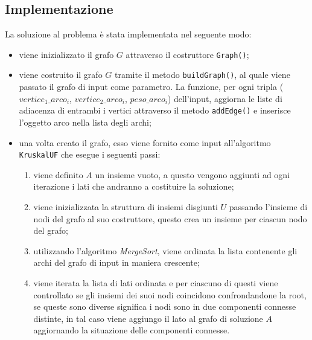 	\subsection{Implementazione}
		La soluzione al problema è stata implementata nel seguente modo:
		\begin{itemize}
			\item viene inizializzato il grafo $G$ attraverso il costruttore \texttt{Graph()};
			\item viene costruito il grafo $G$ tramite il metodo \texttt{buildGraph()}, al quale viene passato il grafo di input come parametro.
			La funzione, per ogni tripla ($vertice_1\_arco_i$, $vertice_2\_arco_i$, $peso\_arco_i$) dell'input, aggiorna le liste di adiacenza di entrambi i vertici attraverso il metodo \texttt{addEdge()} e inserisce l'oggetto arco nella lista degli archi; 
			\item una volta creato il grafo, esso viene fornito come input all'algoritmo \texttt{KruskalUF} che esegue i seguenti passi:
			\begin{enumerate}  				
				\item viene definito $A$ un insieme vuoto, a questo vengono aggiunti ad ogni iterazione i lati che andranno a costituire la soluzione;
				\item viene inizializzata la struttura di insiemi disgiunti $U$ passando l'insieme di nodi del grafo al suo costruttore, questo crea un insieme per ciascun nodo del grafo;
				\item utilizzando l'algoritmo \textit{MergeSort}, viene ordinata la lista contenente gli archi del grafo di input in maniera crescente;		
				\item viene iterata la lista di lati ordinata e per ciascuno di questi viene controllato se gli insiemi dei suoi nodi coincidono confrondandone la root, se queste sono diverse significa i nodi sono in due componenti connesse distinte, in tal caso viene aggiungo il lato al grafo di soluzione $A$ aggiornando la situazione delle componenti connesse.
			\end{enumerate}
		\end{itemize}
	
